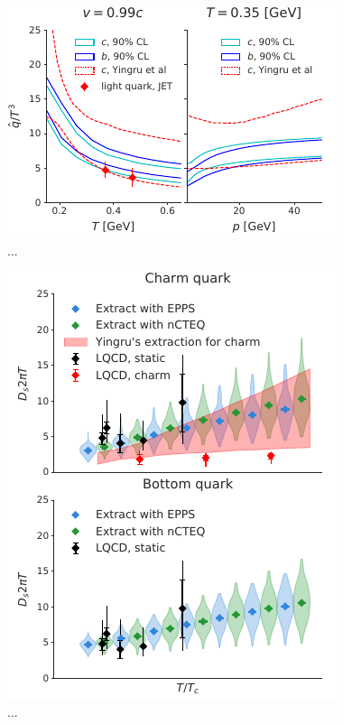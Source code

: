 \documentclass[aps, prc, reprint, amsmath, groupedaddress, nofootinbib]{revtex4-1}
\begin{document}
\begin{figure}
\includegraphics[width=\columnwidth]{qhat_p_T.pdf}
\caption{...}\label{plots:posterior_qhat}
\end{figure}

\begin{figure}
\includegraphics[width=\columnwidth]{Ds_posterior.pdf}
\caption{...}\label{plots:posterior_Ds}
\end{figure}
\end{document}
